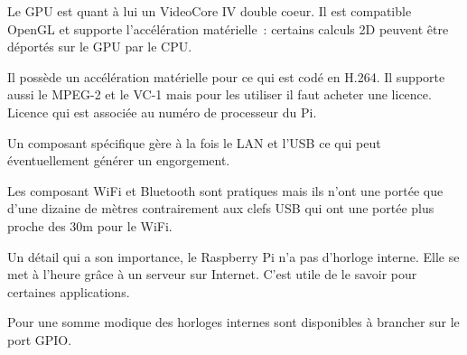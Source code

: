 Le GPU est quant à lui un VideoCore IV double coeur. Il est compatible OpenGL et supporte l'accélération matérielle~: certains calculs 2D peuvent être déportés sur le GPU par le CPU.

Il possède un accélération matérielle pour ce qui est codé en H.264. Il supporte aussi le MPEG-2 et le VC-1 mais pour les utiliser il faut acheter une licence. Licence qui est associée au numéro de processeur du Pi.

Un composant spécifique gère à la fois le LAN et l'USB ce qui peut éventuellement générer un engorgement.

Les composant WiFi et Bluetooth sont pratiques mais ils n'ont une portée que d'une dizaine de mètres contrairement aux clefs USB qui ont une portée plus proche des 30m pour le WiFi.

Un détail qui a son importance, le Raspberry Pi n'a pas d'horloge interne. Elle se met à l'heure grâce à un serveur sur Internet. C'est utile de le savoir pour certaines applications.

Pour une somme modique des horloges internes sont disponibles à brancher sur le port GPIO.




